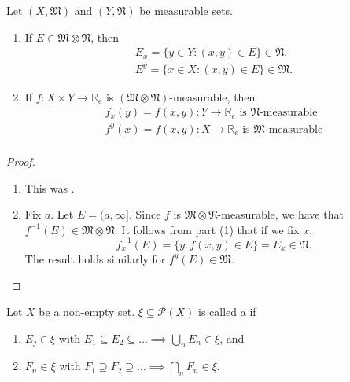 \documentclass[notoc,notitlepage]{tufte-book}
\begin{document}
\begin{propo}\label{propo:component_wise_measurability_of_functions_and_sets}
  Let $(X, \mathfrak{M})$ and $(Y, \mathfrak{N})$ be measurable sets.
  \begin{enumerate}
    \item If $E \in \mathfrak{M} \otimes \mathfrak{N}$, then
      \begin{gather*}
        E_x = \{ y \in Y : (x, y) \in E \} \in \mathfrak{N}, \\
        E^y = \{ x \in X : (x, y) \in E \} \in \mathfrak{M}.
      \end{gather*}
    \item If $f : X \times Y \to \mathbb{R}_e$ is
      $(\mathfrak{M} \otimes \mathfrak{N})$-measurable, then
      \begin{gather*}
        f_x(y) = f(x, y) : Y \to \mathbb{R}_e
          \text{ is } \mathfrak{N}\text{-measurable} \\
        f^y(x) = f(x, y) : X \to \mathbb{R}_e
          \text{ is } \mathfrak{M}\text{-measurable} \\
      \end{gather*}
  \end{enumerate}
\end{propo}

\begin{proof}
  \begin{enumerate}
    \item This was .
    \item Fix $a$. Let $E = (a, \infty]$.
      Since $f$ is $\mathfrak{M} \otimes \mathfrak{N}$-measurable,
      we have that $f^{-1}(E) \in \mathfrak{M} \otimes \mathfrak{N}$.
      It follows from part (1) that if we fix $x$,
      \begin{equation*}
        f_x^{-1}(E) = \{ y : f(x, y) \in E \} = E_x \in \mathfrak{N}.
      \end{equation*}
      The result holds similarly for $f^y(E) \in \mathfrak{M}$.
  \end{enumerate}
\end{proof}

\begin{defn}\label{defn:monotone_classes}
  Let $X$ be a non-empty set.
  $\xi \subseteq \mathcal{P}(X)$ is called a 
  if
  \begin{enumerate}
    \item $E_j \in \xi$ with $E_1 \subseteq E_2 \subseteq \hdots
      \implies \bigcup_{n} E_n \in \xi$, and
    \item $F_n \in \xi$ with $F_1 \supseteq F_2 \supseteq \hdots
      \implies \bigcap_{n} F_n \in \xi$.
  \end{enumerate}
\end{defn}
\end{document}
